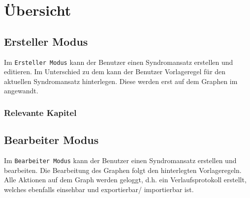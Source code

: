 \documentclass[enabledeprecatedfontcommands,fontsize=11pt,paper=a4,twoside]{scrartcl}
\newcounter{one}
\newcounter{two}[one]
\let\tempone\itemize
\let\temptwo\enditemize
\renewenvironment{itemize}{\tempone\addtolength{\itemsep}{-10.0pt}}{\temptwo}
\begin{document}
\clearpage	
\section{Übersicht} \label{sec:uebersicht}
\subsection{Ersteller Modus}
Im \texttt{Ersteller Modus} kann der Benutzer einen Syndromansatz erstellen und editieren. Im Unterschied zu dem  kann der Benutzer Vorlageregel für den aktuellen Syndromansatz hinterlegen. Diese werden erst auf dem Graphen im  angewandt. 


\subsubsection{Relevante Kapitel}
\begin{itemize}
	\item {}
	\item {}
	\item {}	
	\item {}	
	\item {}	
	\item {}
	\item {}
	\item {}
	\item {}
	\item {}
	\item {}
	\item {}
	\item {}
	\item {}
	\item {}
	\item {}
	\item {}	
\end{itemize}
\subsection{Bearbeiter Modus} \label{sec:editor}
Im \texttt{Bearbeiter Modus} kann der Benutzer einen Syndromansatz erstellen und bearbeiten. Die Bearbeitung des Graphen folgt den hinterlegten Vorlageregeln. Alle Aktionen auf dem Graph werden geloggt, d.h. ein Verlaufsprotokoll erstellt, welches ebenfalls einsehbar und exportierbar/ importierbar ist. 
\end{document}
